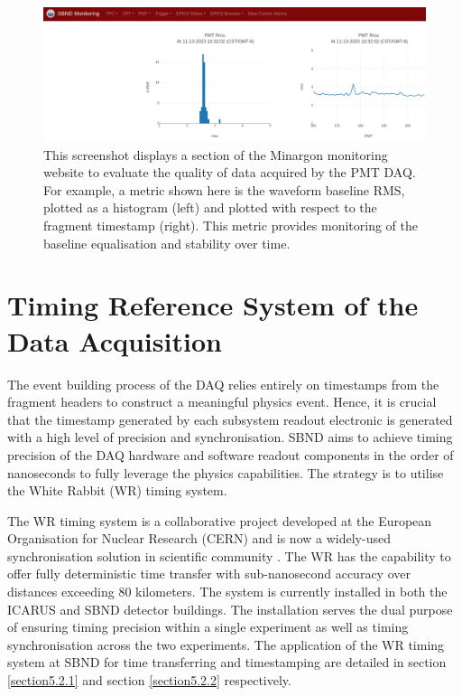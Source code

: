 \begin{figure}[htbp!] 
\centering    
\includegraphics[width=1.0\textwidth]{Minargon}
\caption[Minargon]{
This screenshot displays a section of the Minargon monitoring website to evaluate the quality of data acquired by the PMT DAQ.
For example, a metric shown here is the waveform baseline RMS, plotted as a histogram (left) and plotted with respect to the fragment timestamp (right).
This metric provides monitoring of the baseline equalisation and stability over time.
}
\label{fig:Minargon}
\end{figure}
\section{Timing Reference System of the Data Acquisition}
\label{section5.2}

The event building process of the DAQ relies entirely on timestamps from the fragment headers to construct a meaningful physics event.
Hence, it is crucial that the timestamp generated by each subsystem readout electronic is generated with a high level of precision and synchronisation.
SBND aims to achieve timing precision of the DAQ hardware and software readout components in the order of nanoseconds to fully leverage the physics capabilities.
The strategy is to utilise the White Rabbit (WR) timing system.

The WR timing system is a collaborative project developed at the European Organisation for Nuclear Research (CERN) and is now a widely-used synchronisation solution in scientific community \cite{WR_paper}.
The WR has the capability to offer fully deterministic time transfer with sub-nanosecond accuracy over distances exceeding 80 kilometers.
The system is currently installed in both the ICARUS and SBND detector buildings.
The installation serves the dual purpose of ensuring timing precision within a single experiment as well as timing synchronisation across the two experiments. 
The application of the WR timing system at SBND for time transferring and timestamping are detailed in section \ref{section5.2.1} and section \ref{section5.2.2} respectively.

